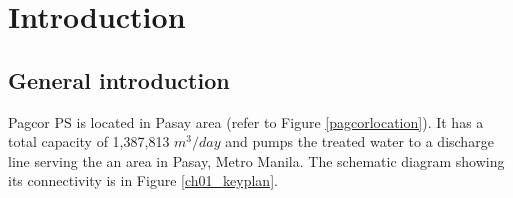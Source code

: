 
\chapter{Introduction} %
\label{Chapter1}

\section{General introduction}
Pagcor PS is located in Pasay area (refer to Figure \ref{pagcorlocation}). It has a total capacity of 1,387,813 $m^3/day$ and pumps the treated water to a discharge line serving the an area in Pasay, Metro Manila. The schematic diagram showing its connectivity is in Figure \ref{ch01_keyplan}.

